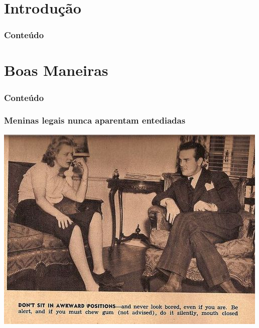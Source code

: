 \section*{Introdução}

\begin{frame}
	\frametitle{Conteúdo}
	\tableofcontents[pausesections]
\end{frame}

\section{Boas Maneiras}

\begin{frame}
	\frametitle{Conteúdo}
	\tableofcontents[currentsection]
\end{frame}

\begin{frame}
	\frametitle{Meninas legais nunca aparentam entediadas}

	\begin{center}
		\includegraphics[scale=0.4]{imagens/position}
	\end{center}

\end{frame}

